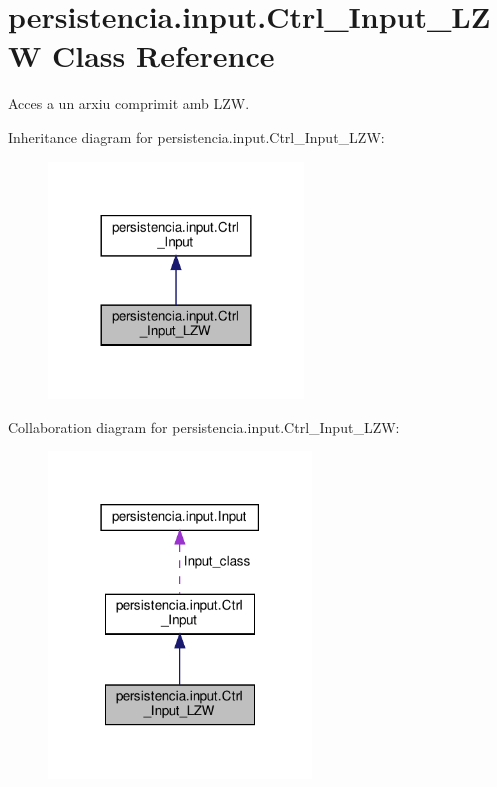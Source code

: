 \hypertarget{classpersistencia_1_1input_1_1Ctrl__Input__LZW}{}\section{persistencia.\+input.\+Ctrl\+\_\+\+Input\+\_\+\+L\+ZW Class Reference}
\label{classpersistencia_1_1input_1_1Ctrl__Input__LZW}


Acces a un arxiu comprimit amb L\+ZW.  




Inheritance diagram for persistencia.\+input.\+Ctrl\+\_\+\+Input\+\_\+\+L\+ZW\+:\nopagebreak
\begin{figure}[H]
\begin{center}
\leavevmode
\includegraphics[width=192pt]{classpersistencia_1_1input_1_1Ctrl__Input__LZW__inherit__graph}
\end{center}
\end{figure}


Collaboration diagram for persistencia.\+input.\+Ctrl\+\_\+\+Input\+\_\+\+L\+ZW\+:\nopagebreak
\begin{figure}[H]
\begin{center}
\leavevmode
\includegraphics[width=198pt]{classpersistencia_1_1input_1_1Ctrl__Input__LZW__coll__graph}
\end{center}
\end{figure}
